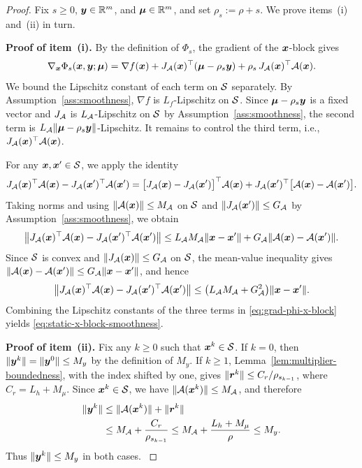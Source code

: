 \begin{proof}
Fix $s\ge0$, $\bm{y}\in\mathbb{R}^m$, and $\bm{\mu}\in\mathbb{R}^m$, and set $\rho_s:=\rho+s$.
We prove items~{\rm (i)} and~{\rm (ii)} in turn.

\textbf{Proof of item~{\rm (i)}.}
By the definition of $\Phi_s$, the gradient of the $\bm{x}$-block gives
\begin{equation}
    \nabla_{\bm{x}}\Phi_s(\bm{x},\bm{y};\bm{\mu})
    =
    \nabla f(\bm{x})
    +J_{\mathcal{A}}(\bm{x})^\top(\bm{\mu}-\rho_s\bm{y})
    +\rho_s\,J_{\mathcal{A}}(\bm{x})^\top\mathcal{A}(\bm{x}).
    \label{eq:grad-phi-x-block}
\end{equation}
We bound the Lipschitz constant of each term on $\mathcal{S}$ separately.
By Assumption~\ref{ass:smoothness}, $\nabla f$ is $L_f$-Lipschitz
on $\mathcal{S}$.  Since $\bm{\mu}-\rho_s\bm{y}$ is a fixed vector and
$J_{\mathcal{A}}$ is $L_{\mathcal{A}}$-Lipschitz on $\mathcal{S}$ by
Assumption~\ref{ass:smoothness}, the second term is
$L_{\mathcal{A}}\|\bm{\mu}-\rho_s\bm{y}\|$-Lipschitz.  It remains to control the third
term, i.e., $J_{\mathcal{A}}(\bm{x})^\top\mathcal{A}(\bm{x})$.

For any $\bm{x},\bm{x}'\in\mathcal{S}$, we apply the identity
\[
    J_{\mathcal{A}}(\bm{x})^\top\mathcal{A}(\bm{x})
    -
    J_{\mathcal{A}}(\bm{x}')^\top\mathcal{A}(\bm{x}')
    =
    \bigl[J_{\mathcal{A}}(\bm{x})-J_{\mathcal{A}}(\bm{x}')\bigr]^\top\mathcal{A}(\bm{x})
    +
    J_{\mathcal{A}}(\bm{x}')^\top\bigl[\mathcal{A}(\bm{x})-\mathcal{A}(\bm{x}')\bigr].
\]
Taking norms and using $\|\mathcal{A}(\bm{x})\|\le M_{\mathcal{A}}$ on $\mathcal{S}$ and
$\|J_{\mathcal{A}}(\bm{x}')\|\le G_{\mathcal{A}}$ by Assumption~\ref{ass:smoothness},
we obtain
\[
    \bigl\|
    J_{\mathcal{A}}(\bm{x})^\top\mathcal{A}(\bm{x})
    -
    J_{\mathcal{A}}(\bm{x}')^\top\mathcal{A}(\bm{x}')
    \bigr\|
    \le
    L_{\mathcal{A}}M_{\mathcal{A}}\|\bm{x}-\bm{x}'\|
    +
    G_{\mathcal{A}}\|\mathcal{A}(\bm{x})-\mathcal{A}(\bm{x}')\|.
\]
Since $\mathcal{S}$ is convex and $\|J_{\mathcal{A}}(\bm{x})\|\le G_{\mathcal{A}}$ on $\mathcal{S}$, the
mean-value inequality gives
$\|\mathcal{A}(\bm{x})-\mathcal{A}(\bm{x}')\|\le G_{\mathcal{A}}\|\bm{x}-\bm{x}'\|$, and hence
\begin{equation}
    \bigl\|
    J_{\mathcal{A}}(\bm{x})^\top\mathcal{A}(\bm{x})
    -
    J_{\mathcal{A}}(\bm{x}')^\top\mathcal{A}(\bm{x}')
    \bigr\|
    \le
    \bigl(L_{\mathcal{A}}M_{\mathcal{A}}+G_{\mathcal{A}}^2\bigr)\|\bm{x}-\bm{x}'\|.
    \label{eq:nonlinear-term-bound}
\end{equation}
Combining the Lipschitz constants of the three terms in
\eqref{eq:grad-phi-x-block} yields
\eqref{eq:static-x-block-smoothness}.

\textbf{Proof of item~{\rm (ii)}.}
{\color{blue}
Fix any $k\ge0$ such that $\bm{x}^k\in\mathcal{S}$.  If $k=0$, then
$\|\bm{y}^k\|=\|\bm{y}^0\|\le M_y$ by the definition of $M_y$.  If $k\ge1$,
Lemma~\ref{lem:multiplier-boundedness}, with the index shifted by one,
gives $\|\bm{r}^k\|\le C_r/\rho_{s_{k-1}}$, where $C_r=L_h+M_\mu$.
Since $\bm{x}^k\in\mathcal{S}$, we have $\|\mathcal{A}(\bm{x}^k)\|\le M_{\mathcal{A}}$, and
therefore
\begin{equation}
\begin{aligned}
    \|\bm{y}^k\|
    &\le
    \|\mathcal{A}(\bm{x}^k)\|+\|\bm{r}^k\|\\
    &\le
    M_{\mathcal{A}}+\frac{C_r}{\rho_{s_{k-1}}}
    \le
    M_{\mathcal{A}}+\frac{L_h+M_\mu}{\rho}
    \le M_y.
\end{aligned}
\label{eq:y-iterate-bound}
\end{equation}
Thus $\|\bm{y}^k\|\le M_y$ in both cases.
}


\end{proof}
